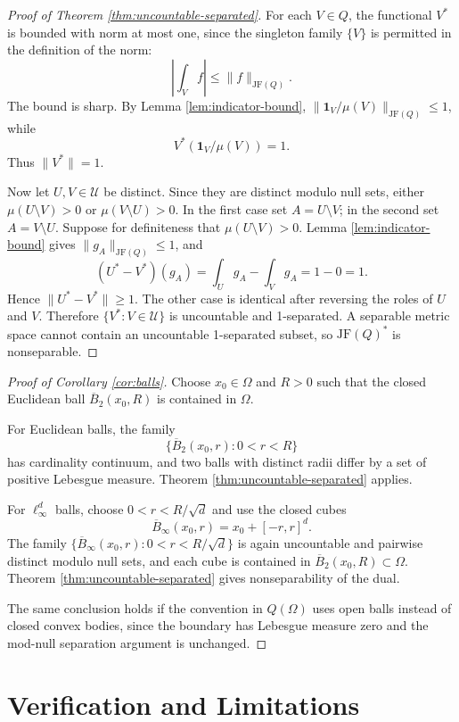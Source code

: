 \documentclass[11pt]{article}
\newcommand{\JF}{\mathrm{JF}}
\newcommand{\1}{\mathbf{1}}
\begin{document}
\begin{proof}[Proof of Theorem \ref{thm:uncountable-separated}]
For each $V\in Q$, the functional $V^*$ is bounded with norm at most one, since
the singleton family $\{V\}$ is permitted in the definition of the norm:
\[
\left|\int_V f\right|\leq \|f\|_{\JF(Q)}.
\]
The bound is sharp.  By Lemma \ref{lem:indicator-bound},
$\|\1_V/\mu(V)\|_{\JF(Q)}\leq 1$, while
\[
V^*(\1_V/\mu(V))=1.
\]
Thus $\|V^*\|=1$.

Now let $U,V\in\mathcal U$ be distinct.  Since they are distinct modulo null
sets, either $\mu(U\setminus V)>0$ or $\mu(V\setminus U)>0$.  In the first
case set $A=U\setminus V$; in the second set $A=V\setminus U$.  Suppose for
definiteness that $\mu(U\setminus V)>0$.  Lemma \ref{lem:indicator-bound}
gives $\|g_A\|_{\JF(Q)}\leq 1$, and
\[
(U^*-V^*)(g_A)
=\int_U g_A-\int_V g_A
=1-0=1.
\]
Hence $\|U^*-V^*\|\geq 1$.  The other case is identical after reversing the
roles of $U$ and $V$.  Therefore $\{V^*:V\in\mathcal U\}$ is uncountable and
1-separated.  A separable metric space cannot contain an uncountable
1-separated subset, so $\JF(Q)^*$ is nonseparable.
\end{proof}

\begin{proof}[Proof of Corollary \ref{cor:balls}]
Choose $x_0\in\Omega$ and $R>0$ such that the closed Euclidean ball
$\overline B_2(x_0,R)$ is contained in $\Omega$.

For Euclidean balls, the family
\[
\{\overline B_2(x_0,r):0<r<R\}
\]
has cardinality continuum, and two balls with distinct radii differ by a set
of positive Lebesgue measure.  Theorem \ref{thm:uncountable-separated} applies.

For $\ell_\infty^d$ balls, choose $0<r<R/\sqrt d$ and use the closed cubes
\[
\overline B_\infty(x_0,r)=x_0+[-r,r]^d.
\]
The family $\{\overline B_\infty(x_0,r):0<r<R/\sqrt d\}$ is again uncountable
and pairwise distinct modulo null sets, and each cube is contained in
$\overline B_2(x_0,R)\subset\Omega$.  Theorem
\ref{thm:uncountable-separated} gives nonseparability of the dual.

The same conclusion holds if the convention in $Q(\Omega)$ uses open balls
instead of closed convex bodies, since the boundary has Lebesgue measure zero
and the mod-null separation argument is unchanged.
\end{proof}

\section{Verification and Limitations}
\end{document}
